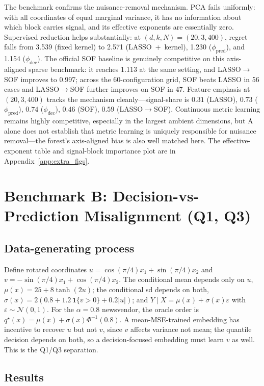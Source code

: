 \documentclass[11pt]{article}
\begin{document}
The benchmark confirms the nuisance-removal mechanism. PCA fails uniformly: with all coordinates of equal marginal variance, it has no information about which block carries signal, and its effective exponents are essentially zero. Supervised reduction helps substantially: at $(d,k,N)=(20,3,400)$, regret falls from 3.539 (fixed kernel) to 2.571 (LASSO~+~kernel), 1.230 ($\phi_{\mathrm{pred}}$), and 1.154 ($\phi_{\mathrm{dec}}$). The official SOF baseline is genuinely competitive on this axis-aligned sparse benchmark: it reaches 1.113 at the same setting, and LASSO$\to$SOF improves to 0.997; across the 60-configuration grid, SOF beats LASSO in 56 cases and LASSO$\to$SOF further improves on SOF in 47. Feature-emphasis at $(20,3,400)$ tracks the mechanism cleanly---signal-share is $0.31$ (LASSO), $0.73$ ($\phi_{\mathrm{pred}}$), $0.74$ ($\phi_{\mathrm{dec}}$), $0.46$ (SOF), $0.59$ (LASSO$\to$SOF). Continuous metric learning remains highly competitive, especially in the largest ambient dimensions, but A alone does not establish that metric learning is uniquely responsible for nuisance removal---the forest's axis-aligned bias is also well matched here. The effective-exponent table and signal-block importance plot are in Appendix~\ref{app:extra_figs}.

\section{Benchmark B: Decision-vs-Prediction Misalignment (Q1, Q3)}\label{sec:benchB}
\subsection*{Data-generating process}
Define rotated coordinates $u=\cos(\pi/4)x_1+\sin(\pi/4)x_2$ and $v=-\sin(\pi/4)x_1+\cos(\pi/4)x_2$. The conditional mean depends only on $u$, $\mu(x)=25+8\tanh(2u)$; the conditional sd depends on both, $\sigma(x)=2(0.8+1.2\,\mathbf 1\{v>0\}+0.2|u|)$; and $Y\mid X=\mu(x)+\sigma(x)\varepsilon$ with $\varepsilon\sim\mathcal N(0,1)$. For the $\alpha=0.8$ newsvendor, the oracle order is $q^\star(x)=\mu(x)+\sigma(x)\Phi^{-1}(0.8)$. A mean-MSE-trained embedding has incentive to recover $u$ but not $v$, since $v$ affects variance not mean; the quantile decision depends on both, so a decision-focused embedding must learn $v$ as well. This is the Q1/Q3 separation.

\subsection*{Results}
\begin{table}[H]
\centering
\small

\caption{Benchmark B summary over 20 replications. PCA is omitted because, in 2D, keeping both PCs is equivalent to the fixed kernel.}
\label{tab:benchmark_b_summary}
\end{table}
\end{document}
